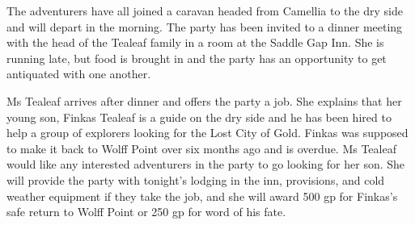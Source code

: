 The adventurers have all joined a caravan headed from Camellia to the dry side and will depart in the morning.
The party has been invited to a dinner meeting with the head of the Tealeaf family in a room at the Saddle Gap Inn.
She is running late, but food is brought in and the party has an opportunity to get antiquated with one another.

Ms Tealeaf arrives after dinner and offers the party a job.
She explains that her young son, Finkas Tealeaf is a guide on the dry side and he has been hired to help a group of explorers looking for the Lost City of Gold.
Finkas was supposed to make it back to Wolff Point over six months ago and is overdue.
Ms Tealeaf would like any interested adventurers in the party to go looking for her son.
She will provide the party with tonight's lodging in the inn, provisions, and cold weather equipment if they take the job, and she will award 500 gp for Finkas's safe return to Wolff Point or 250 gp for word of his fate.
